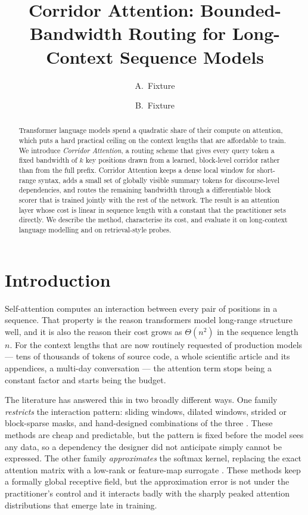 \documentclass[11pt]{article}
\title{Corridor Attention: Bounded-Bandwidth Routing for Long-Context
Sequence Models}
\author{A.~Fixture \and B.~Fixture}
\date{}
\begin{document}
\maketitle

\begin{abstract}
Transformer language models spend a quadratic share of their compute on
attention, which puts a hard practical ceiling on the context lengths that are
affordable to train. We introduce \emph{Corridor Attention}, a routing scheme
that gives every query token a fixed bandwidth of $k$ key positions drawn from
a learned, block-level corridor rather than from the full prefix. Corridor
Attention keeps a dense local window for short-range syntax, adds a small set
of globally visible summary tokens for discourse-level dependencies, and routes
the remaining bandwidth through a differentiable block scorer that is trained
jointly with the rest of the network. The result is an attention layer whose
cost is linear in sequence length with a constant that the practitioner sets
directly. We describe the method, characterise its cost, and evaluate it on
long-context language modelling and on retrieval-style probes.
\end{abstract}

\section{Introduction}\label{sec:intro}

Self-attention \citep{vaswani2017attention} computes an interaction between
every pair of positions in a sequence. That property is the reason
transformers model long-range structure well, and it is also the reason their
cost grows as $\Theta(n^2)$ in the sequence length $n$. For the context
lengths that are now routinely requested of production models --- tens of
thousands of tokens of source code, a whole scientific article and its
appendices, a multi-day conversation --- the attention term stops being a
constant factor and starts being the budget.

The literature has answered this in two broadly different ways. One family
\emph{restricts} the interaction pattern: sliding windows, dilated windows,
strided or block-sparse masks, and hand-designed combinations of the three
\citep{child2019sparse,beltagy2020longformer,zaheer2020bigbird}. These methods
are cheap and predictable, but the pattern is fixed before the model sees any
data, so a dependency the designer did not anticipate simply cannot be
expressed. The other family \emph{approximates} the softmax kernel, replacing
the exact attention matrix with a low-rank or feature-map surrogate
\citep{wang2020linformer,katharopoulos2020linear,choromanski2021performer}.
These methods keep a formally global receptive field, but the approximation
error is not under the practitioner's control and it interacts badly with the
sharply peaked attention distributions that emerge late in training.
\end{document}
